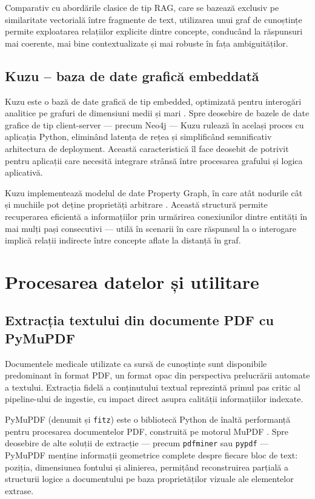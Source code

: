 \documentclass[12pt, a4paper, oneside, romanian]{teza-upb}
\begin{document}
Comparativ cu abordările clasice de tip RAG, care se bazează exclusiv pe similaritate vectorială între fragmente de text, utilizarea unui graf de cunoștințe permite exploatarea relațiilor explicite dintre concepte, conducând la răspunsuri mai coerente, mai bine contextualizate și mai robuste în fața ambiguităților.

\subsection{Kuzu -- baza de date grafică embeddată}

Kuzu este o bază de date grafică de tip embedded, optimizată pentru interogări analitice pe grafuri de dimensiuni medii și mari \cite{kuzu_doc}. Spre deosebire de bazele de date grafice de tip client-server — precum Neo4j — Kuzu rulează în același proces cu aplicația Python, eliminând latența de rețea și simplificând semnificativ arhitectura de deployment. Această caracteristică îl face deosebit de potrivit pentru aplicații care necesită integrare strânsă între procesarea grafului și logica aplicativă.

Kuzu implementează modelul de date Property Graph, în care atât nodurile cât 
și muchiile pot deține proprietăți arbitrare \cite{kuzu_doc, kuzu:cidr}. 
Această structură permite recuperarea eficientă a informațiilor prin urmărirea 
conexiunilor dintre entități în mai mulți pași consecutivi — utilă în scenarii 
în care răspunsul la o interogare implică relații indirecte între concepte 
aflate la distanță în graf.

\section{Procesarea datelor și utilitare}

\subsection{Extracția textului din documente PDF cu PyMuPDF}

Documentele medicale utilizate ca sursă de cunoștințe sunt disponibile predominant în format PDF, un format opac din perspectiva prelucrării automate a textului. Extracția fidelă a conținutului textual reprezintă primul pas critic al pipeline-ului de ingestie, cu impact direct asupra calității informațiilor indexate.

PyMuPDF (denumit și \texttt{fitz}) este o bibliotecă Python de înaltă performanță pentru procesarea documentelor PDF, construită pe motorul MuPDF \cite{pymupdf_doc}. Spre deosebire de alte soluții de extracție — precum \texttt{pdfminer} sau \texttt{pypdf} — PyMuPDF menține informații geometrice complete despre fiecare bloc de text: poziția, dimensiunea fontului și alinierea, permițând reconstruirea parțială a structurii logice a documentului pe baza proprietăților vizuale ale elementelor extrase.
\end{document}

